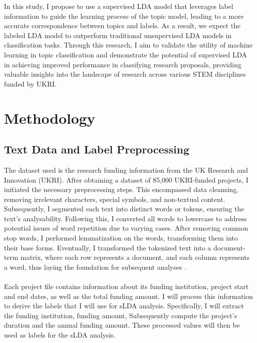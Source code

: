 \documentclass[12pt,twoside]{article}
\begin{document}
In this study, I propose to use a supervised LDA model that leverages label information to guide the learning process of the topic model, leading to a more accurate correspondence between topics and labels. As a result, we expect the labeled LDA model to outperform traditional unsupervised LDA models in classification tasks. Through this research, I aim to validate the utility of machine learning in topic classification and demonstrate the potential of supervised LDA in achieving improved performance in classifying research proposals, providing valuable insights into the landscape of research across various STEM disciplines funded by UKRI.


\section{Methodology}

\subsection{Text Data and Label Preprocessing}

The dataset used is the research funding information from the UK Research and Innovation (UKRI). After obtaining a dataset of 85,000 UKRI-funded projects, I initiated the necessary preprocessing steps. This encompassed data cleansing, removing irrelevant characters, special symbols, and non-textual content. Subsequently, I segmented each text into distinct words or tokens, ensuring the text's analysability. Following this, I converted all words to lowercase to address potential issues of word repetition due to varying cases. After removing common stop words, I performed lemmatization on the words, transforming them into their base forms. Eventually, I transformed the tokenized text into a document-term matrix, where each row represents a document, and each column represents a word, thus laying the foundation for subsequent analyses \cite{kochmar2022getting}. \\\\

Each project file contains information about its funding institution, project start and end dates, as well as the total funding amount. I will process this information to derive the labels that I will use for sLDA analysis. Specifically, I will extract the funding institution, funding amount, Subsequently compute the project's duration and the annual funding amount. These processed values will then be used as labels for the sLDA analysis. \\\\
\end{document}
